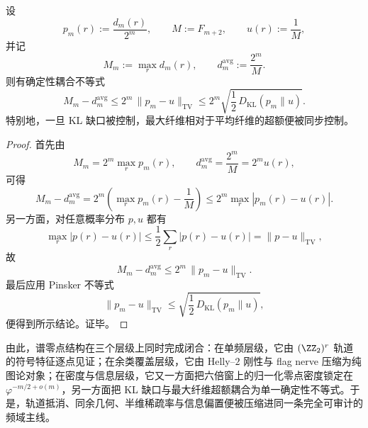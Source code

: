 \begin{theorem}\label{thm:xi-time-part70c-kl-gap-controls-maxfiber-excess}
设
\[
p_m(r):=\frac{d_m(r)}{2^m},
\qquad
M:=F_{m+2},
\qquad
u(r):=\frac1M,
\]
并记
\[
M_m:=\max_r d_m(r),
\qquad
d_m^{\mathrm{avg}}:=\frac{2^m}{M}.
\]
则有确定性耦合不等式
\[
\boxed{\;
M_m-d_m^{\mathrm{avg}}
\le
2^m\,\|p_m-u\|_{\mathrm{TV}}
\le
2^m\sqrt{\frac12\,D_{\mathrm{KL}}(p_m\|u)}.\;}
\]
特别地，一旦 KL 缺口被控制，最大纤维相对于平均纤维的超额便被同步控制。
\end{theorem}
\begin{proof}
首先由
\[
M_m=2^m\max_r p_m(r),
\qquad
d_m^{\mathrm{avg}}=\frac{2^m}{M}=2^m u(r),
\]
可得
\[
M_m-d_m^{\mathrm{avg}}
=
2^m\left(\max_r p_m(r)-\frac1M\right)
\le
2^m\max_r|p_m(r)-u(r)|.
\]
另一方面，对任意概率分布 \(p,u\) 都有
\[
\max_r|p(r)-u(r)|
\le
\frac12\sum_r|p(r)-u(r)|
=
\|p-u\|_{\mathrm{TV}},
\]
故
\[
M_m-d_m^{\mathrm{avg}}
\le
2^m\,\|p_m-u\|_{\mathrm{TV}}.
\]
最后应用 Pinsker 不等式
\[
\|p_m-u\|_{\mathrm{TV}}
\le
\sqrt{\frac12\,D_{\mathrm{KL}}(p_m\|u)},
\]
便得到所示结论。证毕。
\end{proof}

\noindent
由此，谱零点结构在三个层级上同时完成闭合：在单频层级，它由 \((\ZZ_2)^r\) 轨道的符号特征逐点见证；在余类覆盖层级，它由 Helly--\(2\) 刚性与 flag nerve 压缩为纯图论对象；在密度与信息层级，它又一方面把六倍窗上的归一化零点密度锁定在 \(\varphi^{-m/2+o(m)}\)，另一方面把 KL 缺口与最大纤维超额耦合为单一确定性不等式。于是，轨道抵消、同余几何、半维稀疏率与信息偏置便被压缩进同一条完全可审计的频域主线。

\endinput
